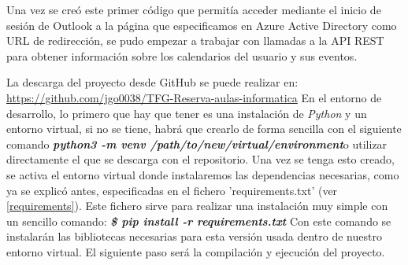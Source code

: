 Una vez se creó este primer código que permitía acceder mediante el inicio de sesión de Outlook a la página que especificamos en Azure Active Directory como URL de redirección, se pudo empezar a trabajar con llamadas a la API REST para obtener información sobre los calendarios del usuario y sus eventos.\newline

La descarga del proyecto desde GitHub se puede realizar en:\newline
\url{https://github.com/jgo0038/TFG-Reserva-aulas-informatica}\newline
En el entorno de desarrollo, lo primero que hay que tener es una instalación de \textit{Python} y un entorno virtual, si no se tiene, habrá que crearlo de forma sencilla con el siguiente comando\newline
\textbf{\textit{python3 -m venv /path/to/new/virtual/environment}}\newline o utilizar directamente el que se descarga con el repositorio.
\newline
 Una vez se tenga esto creado, se activa el entorno virtual donde instalaremos las dependencias necesarias, como ya se explicó antes, especificadas en el fichero 'requirements.txt' (ver \ref{requirements}). Este fichero sirve para realizar una instalación muy simple con un sencillo comando: \newline
 \textbf{\textit{\$ pip install -r requirements.txt }} \newline
Con este comando se instalarán las bibliotecas necesarias para esta versión usada dentro de nuestro entorno virtual. El siguiente paso será la compilación y ejecución del proyecto. \newline

